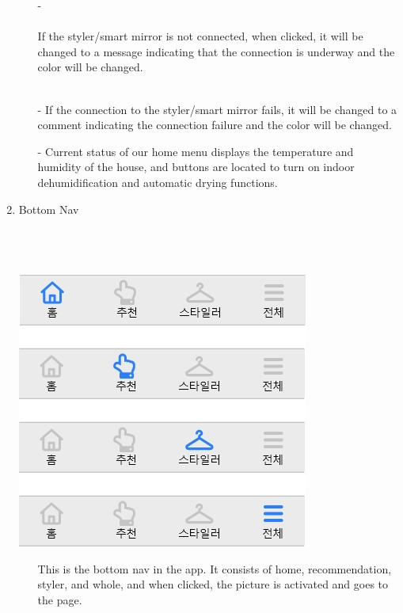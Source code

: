 \documentclass[conference]{IEEEtran}
\begin{document}
\begin{enumerate}
\begin{enumerate}
 \break
 \item[-] \\ \\ If the styler/smart mirror is not connected, when clicked, it will be changed to a message indicating that the connection is underway and the color will be changed.\\\\
 \item[-] If the connection to the styler/smart mirror fails, it will be changed to a comment indicating the connection failure and the color will be changed.
 \item[-] Current status of our home menu displays the temperature and humidity of the house, and buttons are located to turn on indoor dehumidification and automatic drying functions.\\
 \end{enumerate}
 \item Bottom Nav \\ \\ \\ \\
 \centerline{\includegraphics[scale=0.5]{하단 nav.jpg}}
 \break
 \begin{itemize}
    \item[] This is the bottom nav in the app. It consists of home, recommendation, styler, and whole, and when clicked, the picture is activated and goes to the page.
\end{itemize}
\end{enumerate}
\end{document}
